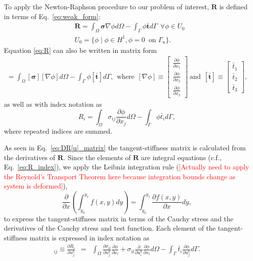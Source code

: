 \documentclass[12pt,aps,pre]{revtex4}
\newcommand{\red}[1]{\textcolor{red}{[#1]}}
\begin{document}
To apply the Newton-Raphson procedure to our problem of interest, $\pmb{R}$ is defined in terms of Eq.\ \eqref{eq:weak_form}:
%
\begin{align}
&\pmb{R} = \int_{\Omega} \pmb{\sigma} \nabla \phi d\Omega - \int_{\Gamma} \phi \bar{\pmb{t}} d\Gamma \ \ \forall \phi \in U_0 \nonumber\\
&U_0 = \{\phi \mid \phi \in H^1, \phi = 0 \ \text{ on } \Gamma_u \} .
\label{eq:R}
\end{align}
% 
Equation \eqref{eq:R} can also be written in matrix form
%
\begin{eqnarray}
[\pmb{R}] = \int_{\Omega} [\pmb{\sigma}] [\nabla \phi] d\Omega - \int_{\Gamma} \phi [\bar{\pmb{t}}] d\Gamma, \ \ \text{where} \ \
%
[\nabla \phi] \equiv 
\begin{bmatrix}
\frac{\partial \phi}{\partial x_1} \\ \frac{\partial \phi}{\partial x_2} \\ \frac{\partial \phi}{\partial x_3}
\end{bmatrix}  \ \text{and} \ \ 
%
[\bar{\pmb{t}}] \equiv 
\begin{bmatrix}
\bar{t}_1 \\ \bar{t}_2 \\ \bar{t}_3
\end{bmatrix},
%
\label{eq:R_matrix}
\end{eqnarray}
%
as well as with index notation as 
%
\begin{equation}
R_i = \int_{\Omega}\sigma_{ij} \frac{\partial \phi}{\partial x_j} d\Omega - \int_{\Gamma} \phi \bar{t}_i d\Gamma,
\label{eq:R_index}
\end{equation}
%
where repeated indices are summed. 

As seen in Eq.\ \eqref{eq:DR[u]_matrix} the tangent-stiffness matrix is calculated from the derivatives of $\pmb{R}$. Since the elements of $\pmb{R}$ are integral equations (c.f., Eq.\ \ref{eq:R_index}), we apply the Leibniz integration rule (\red{Actually need to apply the Reynold's Transport Theorem here because integration bounds change as system is deformed}),
%
\begin{equation}
\frac{\partial}{\partial x}\left(\int_{y_0}^{y_1} f(x,y) dy \right) = \int_{y_0}^{y_1} \frac{\partial f(x,y)}{\partial x} dy,
\label{eq:leibniz}
\end{equation}
%
to express the tangent-stiffness matrix in terms of the Cauchy stress and the derivatives of the Cauchy stress and test function. Each element of the tangent-stiffness matrix is expressed in index notation as
%
\begin{eqnarray}
[\pmb{K}(\pmb{u}^k)]_{ij} \equiv \frac{\partial R_i}{\partial u_j^k} &=& \int_{\Omega} \frac{\partial \sigma_{il}}{\partial u_j^k} \frac{\partial \phi}{\partial x_l}  +  \sigma_{il} \frac{\partial}{\partial u_i^k}\frac{\partial \phi}{\partial x_l} d\Omega - \int_{\Gamma} \bar{t}_i \frac{\partial \phi}{\partial u_j^k} d\Gamma .
\label{eq:tangent-stiffness_index}
\end{eqnarray}
%
\end{document}
